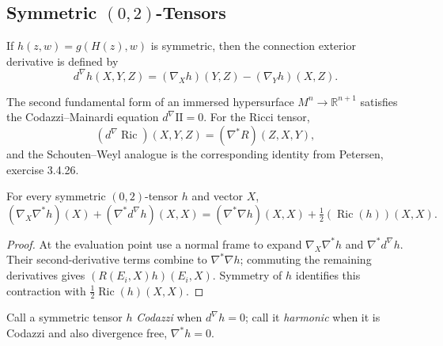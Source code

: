 \subsection{Symmetric $(0,2)$-Tensors}

\begin{definition}
  \label{def:pet-ch9-codazzi-exterior-derivative}

  If $h(z,w)=g(H(z),w)$ is symmetric, then the connection exterior derivative
  is defined by
  \[
    d^\nabla h(X,Y,Z)=(\nabla_Xh)(Y,Z)-(\nabla_Yh)(X,Z).
  \]
\end{definition}

\begin{remark}
  \label{rem:pet-ch9-ricci-codazzi-identity}

  The second fundamental form of an immersed hypersurface
  $M^n\to\mathbb R^{n+1}$ satisfies the Codazzi--Mainardi equation
  $d^\nabla\mathrm{II}=0$. For the Ricci tensor,
  \[
    (d^\nabla\operatorname{Ric})(X,Y,Z)=(\nabla^*R)(Z,X,Y),
  \]
  and the Schouten--Weyl analogue is the corresponding identity from
  Petersen, exercise 3.4.26.
\end{remark}

\begin{theorem}
  \label{thm:pet-ch9-symmetric-tensor-lichnerowicz-identity}

  For every symmetric $(0,2)$-tensor $h$ and vector $X$,
  \[
    (\nabla_X\nabla^*h)(X)+(\nabla^*d^\nabla h)(X,X)
    =(\nabla^*\nabla h)(X,X)+\tfrac12(\operatorname{Ric}(h))(X,X).
  \]
\end{theorem}
\begin{proof}
  \sketch
  At the evaluation point use a normal frame to expand
  \(\nabla_X\nabla^*h\) and \(\nabla^*d^\nabla h\).  Their second-derivative
  terms combine to \(\nabla^*\nabla h\); commuting the remaining derivatives
  gives \((R(E_i,X)h)(E_i,X)\).  Symmetry of \(h\) identifies this contraction
  with \(\tfrac12\operatorname{Ric}(h)(X,X)\).
\end{proof}

\begin{definition}
  \label{def:pet-ch9-codazzi-harmonic-tensor}

  Call a symmetric tensor $h$ \emph{Codazzi} when $d^\nabla h=0$; call it
  \emph{harmonic} when it is Codazzi and also divergence free,
  $\nabla^*h=0$.
\end{definition}

